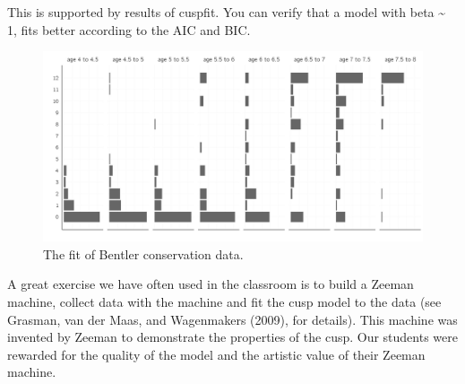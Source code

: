 \documentclass[
  a4paper,
  DIV=11,
  numbers=noendperiod,
  oneside]{scrreprt}
\begin{document}
This is supported by results of cuspfit. You can verify that a model
with beta \textasciitilde{} 1, fits better according to the AIC and BIC.

\begin{figure}

{\centering \includegraphics{media/ch3/fig-ch3-img25-old-37.jpg}

}

\caption{\label{fig-ch3-img25-old-37}The fit of Bentler conservation
data.}

\end{figure}

A great exercise we have often used in the classroom is to build a
Zeeman machine, collect data with the machine and fit the cusp model to
the data (see Grasman, van der Maas, and Wagenmakers (2009), for
details). This machine was invented by Zeeman to demonstrate the
properties of the cusp. Our students were rewarded for the quality of
the model and the artistic value of their Zeeman machine.
\end{document}

